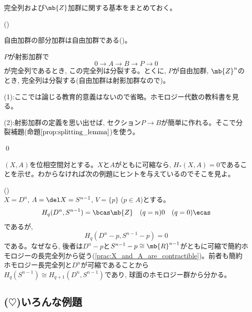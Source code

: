 完全列および$\mb{Z}$加群に関する基本をまとめておく。
\begin{prop} ()\\
\ben
\item 自由加群の部分加群は自由加群である(\tf{})。
\item $P$が射影加群で
\[0\to A\to B\to P \to 0\]
が完全列であるとき, この完全列は分裂する。とくに, $P$が自由加群, $\mb{Z}^{n}$のとき, 完全列は分裂する(自由加群は射影加群なので)。
\item 
\een
\end{prop}
\prf 
(1):ここでは論じる教育的意義はないので省略。ホモロジー代数の教科書を見る。

(2):射影加群の定義を思い出せば, セクション$P\to B$が簡単に作れる。そこで分裂補題(命題$\ref{prop:splitting_lemma}$)を使う。

\qed

\begin{prac} \label{prac:X_and_A_are_contractible}
$(X,A)$を位相空間対とする。$X$と$A$がともに可縮なら, $H_{\ast}(X,A) = 0$であることを示せ。わからなければ次の例題にヒントを与えているのでそこを見よ。
\end{prac}




\begin{egprob} ()\\
$X = D^{n}$, $A=\del X = S^{n-1}$, $V=\{ p \}$ ($p\in A$)とする。
\[H_{q}(D^{n}, S^{n-1}) = \bcas \mb{Z}\quad (q=n) \\ 0 \quad (q=0) \ecas\]
であるが, 
\[H_{q}(D^{n} - p, S^{n-1} - p) = 0\]
である。なぜなら, 後者は$D^n - p$と$S^{n-1} - p \cong \mb{R}^{n-1}$がともに可縮で簡約ホモロジーの長完全列から従う(\ref{prac:X_and_A_are_contractible})。前者も簡約ホモロジー長完全列と$D^{n}$が可縮であることから$H_{q}(S^{n-1}) \cong H_{q+1}(D^{n},S^{n-1})$であり, 球面のホモロジー群から分かる。
\end{egprob}



\subsection{($\heartsuit$)いろんな例題}
